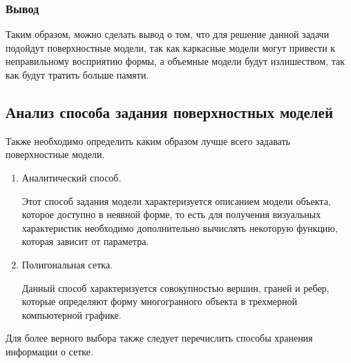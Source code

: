 \subsubsection{Вывод}	
Таким образом, можно сделать вывод о том, что для решение данной задачи подойдут поверхностные модели, так как каркасные модели могут привести к неправильному восприятию формы, а объемные модели будут излишеством, так как будут тратить больше памяти.



\subsection{Анализ способа задания поверхностных моделей}
Также необходимо определить каким образом лучше всего задавать поверхностные модели.

\begin{enumerate} 
\item Аналитический способ.

 Этот способ задания модели характеризуется описанием модели объекта, которое доступно в неявной форме, то есть для получения визуальных характеристик необходимо дополнительно вычислять некоторую функцию, которая зависит от параметра.

\item Полигональная сетка.

 Данный способ характеризуется совокупностью вершин, граней и ребер, которые определяют форму многогранного объекта в трехмерной компьютерной графике.

\end{enumerate}


Для более верного выбора также следует перечислить способы хранения информации о сетке.

